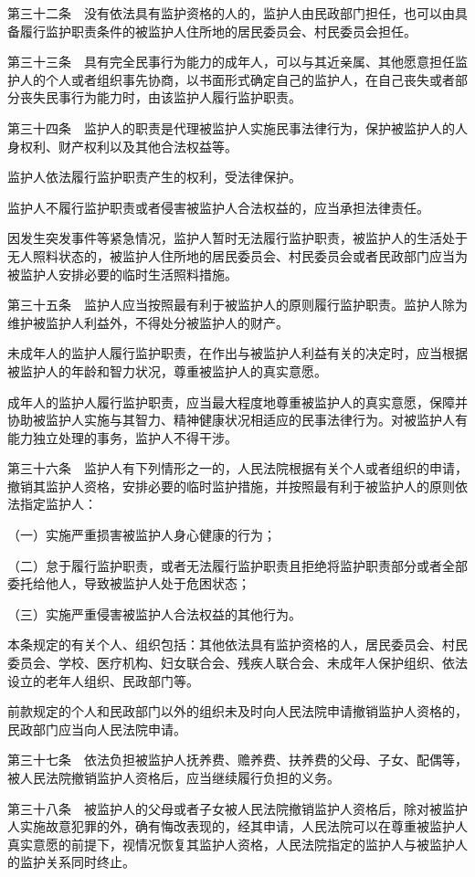 \documentclass[UTF8,12pt,a4paper]{ctexbook}
\begin{document}
第三十二条　没有依法具有监护资格的人的，监护人由民政部门担任，也可以由具备履行监护职责条件的被监护人住所地的居民委员会、村民委员会担任。

第三十三条　具有完全民事行为能力的成年人，可以与其近亲属、其他愿意担任监护人的个人或者组织事先协商，以书面形式确定自己的监护人，在自己丧失或者部分丧失民事行为能力时，由该监护人履行监护职责。

第三十四条　监护人的职责是代理被监护人实施民事法律行为，保护被监护人的人身权利、财产权利以及其他合法权益等。

监护人依法履行监护职责产生的权利，受法律保护。

监护人不履行监护职责或者侵害被监护人合法权益的，应当承担法律责任。

因发生突发事件等紧急情况，监护人暂时无法履行监护职责，被监护人的生活处于无人照料状态的，被监护人住所地的居民委员会、村民委员会或者民政部门应当为被监护人安排必要的临时生活照料措施。

第三十五条　监护人应当按照最有利于被监护人的原则履行监护职责。监护人除为维护被监护人利益外，不得处分被监护人的财产。

未成年人的监护人履行监护职责，在作出与被监护人利益有关的决定时，应当根据被监护人的年龄和智力状况，尊重被监护人的真实意愿。

成年人的监护人履行监护职责，应当最大程度地尊重被监护人的真实意愿，保障并协助被监护人实施与其智力、精神健康状况相适应的民事法律行为。对被监护人有能力独立处理的事务，监护人不得干涉。

第三十六条　监护人有下列情形之一的，人民法院根据有关个人或者组织的申请，撤销其监护人资格，安排必要的临时监护措施，并按照最有利于被监护人的原则依法指定监护人：

（一）实施严重损害被监护人身心健康的行为；

（二）怠于履行监护职责，或者无法履行监护职责且拒绝将监护职责部分或者全部委托给他人，导致被监护人处于危困状态；

（三）实施严重侵害被监护人合法权益的其他行为。

本条规定的有关个人、组织包括：其他依法具有监护资格的人，居民委员会、村民委员会、学校、医疗机构、妇女联合会、残疾人联合会、未成年人保护组织、依法设立的老年人组织、民政部门等。

前款规定的个人和民政部门以外的组织未及时向人民法院申请撤销监护人资格的，民政部门应当向人民法院申请。

第三十七条　依法负担被监护人抚养费、赡养费、扶养费的父母、子女、配偶等，被人民法院撤销监护人资格后，应当继续履行负担的义务。

第三十八条　被监护人的父母或者子女被人民法院撤销监护人资格后，除对被监护人实施故意犯罪的外，确有悔改表现的，经其申请，人民法院可以在尊重被监护人真实意愿的前提下，视情况恢复其监护人资格，人民法院指定的监护人与被监护人的监护关系同时终止。
\end{document}

